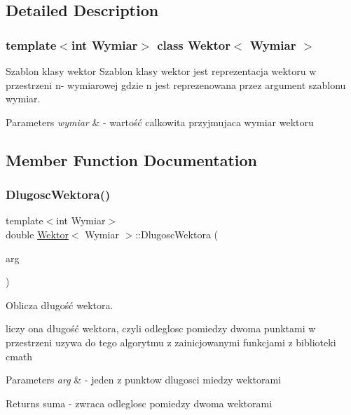 \subsection{Detailed Description}
\subsubsection*{template$<$int Wymiar$>$\newline
class Wektor$<$ Wymiar $>$}

Szablon klasy wektor Szablon klasy wektor jest reprezentacja wektoru w przestrzeni n-\/ wymiarowej gdzie n jest reprezenowana przez argument szablonu wymiar. 


\begin{DoxyParams}{Parameters}
{\em wymiar} & -\/ wartość calkowita przyjmujaca wymiar wektoru \\
\hline
\end{DoxyParams}


\subsection{Member Function Documentation}
\mbox{\label{classWektor_a74d55a6b59308fe4501e0159cf2dbc17}} 
\subsubsection{\texorpdfstring{Dlugosc\+Wektora()}{DlugoscWektora()}}
{\footnotesize\ttfamily template$<$int Wymiar$>$ \\
double \hyperlink{classWektor}{Wektor}$<$ Wymiar $>$\+::Dlugosc\+Wektora (\begin{DoxyParamCaption}\item[{\hyperlink{classWektor}{Wektor}$<$ Wymiar $>$}]{arg }\end{DoxyParamCaption})\hspace{0.3cm}{\ttfamily [inline]}}



Oblicza długość wektora. 

liczy ona długość wektora, czyli odleglosc pomiedzy dwoma punktami w przestrzeni uzywa do tego algorytmu z zainicjowanymi funkcjami z biblioteki cmath 
\begin{DoxyParams}{Parameters}
{\em arg} & -\/ jeden z punktow dlugosci miedzy wektorami \\
\hline
\end{DoxyParams}
\begin{DoxyReturn}{Returns}
suma -\/ zwraca odleglosc pomiedzy dwoma wektorami 
\end{DoxyReturn}
\mbox{\label{classWektor_a207e99f62caf9dd33439bc50545a9c23}} 
